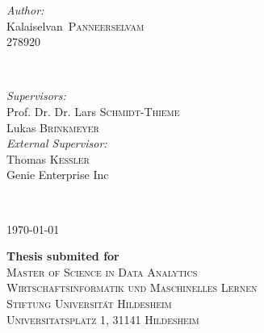 \documentclass[a4paper,12pt]{report}
\begin{document}
\begin{titlepage}
\begin{minipage}{0.34\textwidth}
\begin{flushleft} \large
\vspace{1cm}
\emph{Author:}\\
\mbox{Kalaiselvan \textsc{Panneerselvam}} \\ %
278920 \\ %
\end{flushleft}
\end{minipage}
~
\begin{minipage}{0.61\textwidth}
\begin{flushright} \large
\emph{Supervisors:} \\
Prof. Dr. Dr. Lars \textsc{Schmidt-Thieme}\\ %
Lukas \textsc{Brinkmeyer}\\ %
\emph{External Supervisor:} \\
Thomas \textsc{Kessler}\\
Genie Enterprise Inc
\end{flushright}
\end{minipage}\\
\vspace{2cm}


{ \today}\\ %
\vspace{1cm}

{ \large \bfseries Thesis submited for}\\  %
\vspace{0.3cm}
\textsc{\Large Master of Science in Data Analytics}\\%
\vspace{1cm}
\textsc{\large Wirtschaftsinformatik und Maschinelles Lernen}\\ %
\vspace{0.3cm}
\textsc{\large Stiftung Universität Hildesheim}\\ %
\vspace{0.3cm}
\textsc{\large Universitatsplätz 1, 31141 Hildesheim}\\ %
\vspace{0.3cm}


\vfill %

\end{titlepage}
\end{document}
